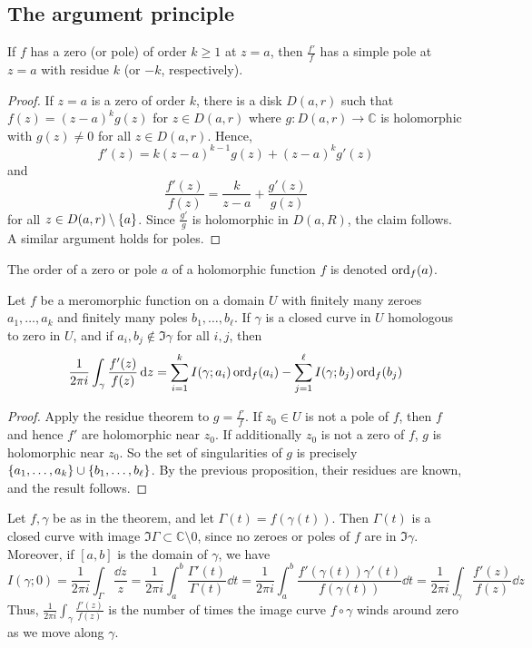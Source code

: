 \subsection{The argument principle}
\begin{proposition}
	If \( f \) has a zero (or pole) of order \( k \geq 1 \) at \( z = a \), then \( \frac{f'}{f} \) has a simple pole at \( z = a \) with residue \( k \) (or \( -k \), respectively).
\end{proposition}
\begin{proof}
	If \( z = a \) is a zero of order \( k \), there is a disk \( D(a,r) \) such that \( f(z) = (z-a)^k g(z) \) for \( z \in D(a,r) \) where \( g \colon D(a,r) \to \mathbb C \) is holomorphic with \( g(z) \neq 0 \) for all \( z \in D(a,r) \).
	Hence,
	\[ f'(z) = k(z-a)^{k-1} g(z) + (z-a)^k g'(z) \]
	and
	\[ \frac{f'(z)}{f(z)} = \frac{k}{z-a} + \frac{g'(z)}{g(z)} \]
	for all \( z \in D(a,r) \setminus \qty{a} \).
	Since \( \frac{g'}{g} \) is holomorphic in \( D(a,R) \), the claim follows.
	A similar argument holds for poles.
\end{proof}
\begin{definition}
	The order of a zero or pole \( a \) of a holomorphic function \( f \) is denoted \( \operatorname{ord}_f(a) \).
\end{definition}
\begin{theorem}
	Let \( f \) be a meromorphic function on a domain \( U \) with finitely many zeroes \( a_1, \dots, a_k \) and finitely many poles \( b_1, \dots, b_\ell \).
	If \( \gamma \) is a closed curve in \( U \) homologous to zero in \( U \), and if \( a_i, b_j \not\in \Im \gamma \) for all \( i,j \), then
	\[ \frac{1}{2\pi i} \int_\gamma \frac{f'(z)}{f(z)} \dd{z} = \sum_{i=1}^k I(\gamma;a_i) \operatorname{ord}_f(a_i) - \sum_{j=1}^\ell I(\gamma;b_j) \operatorname{ord}_f(b_j) \]
\end{theorem}
\begin{proof}
	Apply the residue theorem to \( g = \frac{f'}{f} \).
	If \( z_0 \in U \) is not a pole of \( f \), then \( f \) and hence \( f' \) are holomorphic near \( z_0 \).
	If additionally \( z_0 \) is not a zero of \( f \), \( g \) is holomorphic near \( z_0 \).
	So the set of singularities of \( g \) is precisely \( \qty{a_1, \dots, a_k} \cup \qty{b_1, \dots, b_\ell} \).
	By the previous proposition, their residues are known, and the result follows.
\end{proof}
\begin{remark}
	Let \( f, \gamma \) be as in the theorem, and let \( \Gamma(t) = f(\gamma(t)) \).
	Then \( \Gamma(t) \) is a closed curve with image \( \Im \Gamma \subset \mathbb C \setminus \qty{0} \), since no zeroes or poles of \( f \) are in \( \Im \gamma \).
	Moreover, if \( [a,b] \) is the domain of \( \gamma \), we have
	\[ I(\gamma;0) = \frac{1}{2\pi i} \int_\Gamma \frac{\dd{z}}{z} = \frac{1}{2\pi i} \int_a^b \frac{\Gamma'(t)}{\Gamma(t)} \dd{t} = \frac{1}{2\pi i} \int_a^b \frac{f'(\gamma(t)) \gamma'(t)}{f(\gamma(t))} \dd{t} = \frac{1}{2 \pi i} \int_\gamma \frac{f'(z)}{f(z)} \dd{z} \]
	Thus, \( \frac{1}{2 \pi i} \int_\gamma \frac{f'(z)}{f(z)} \) is the number of times the image curve \( f \circ \gamma \) winds around zero as we move along \( \gamma \).
\end{remark}
